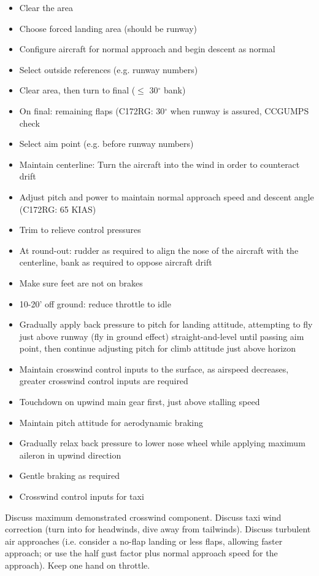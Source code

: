 \begin{itemize}
  \item Clear the area
  \item Choose forced landing area (should be runway)
  \item Configure aircraft for normal approach and begin descent as normal
  \item Select outside references (e.g. runway numbers)
  \item Clear area, then turn to final ($\leq$ 30$^\circ$ bank)
  \item On final: remaining flaps (C172RG: 30$^\circ$ when runway is assured,
    CCGUMPS check
  \item Select aim point (e.g. before runway numbers)
  \item Maintain centerline: Turn the aircraft into the wind in order to
    counteract drift
  \item Adjust pitch and power to maintain normal approach speed and descent
    angle (C172RG: 65 KIAS)
  \item Trim to relieve control pressures
  \item At round-out: rudder as required to align the nose of the aircraft with
    the centerline, bank as required to oppose aircraft drift
  \item Make sure feet are not on brakes
  \item 10-20' off ground: reduce throttle to idle
  \item Gradually apply back pressure to pitch for landing attitude, attempting
    to fly just above runway (fly in ground effect) straight-and-level until
    passing aim point, then continue adjusting pitch for climb attitude just
    above horizon
  \item Maintain crosswind control inputs to the surface, as airspeed
    decreases, greater crosswind control inputs are required 
  \item Touchdown on upwind main gear first, just above stalling speed
  \item Maintain pitch attitude for aerodynamic braking
  \item Gradually relax back pressure to lower nose wheel while applying
    maximum aileron in upwind direction
  \item Gentle braking as required
  \item Crosswind control inputs for taxi
\end{itemize}

Discuss maximum demonstrated crosswind component. Discuss taxi wind correction
(turn into for headwinds, dive away from tailwinds). Discuss turbulent air
approaches (i.e. consider a no-flap landing or less flaps, allowing faster
approach; or use the half gust factor plus normal approach speed for the
approach). Keep one hand on throttle.

